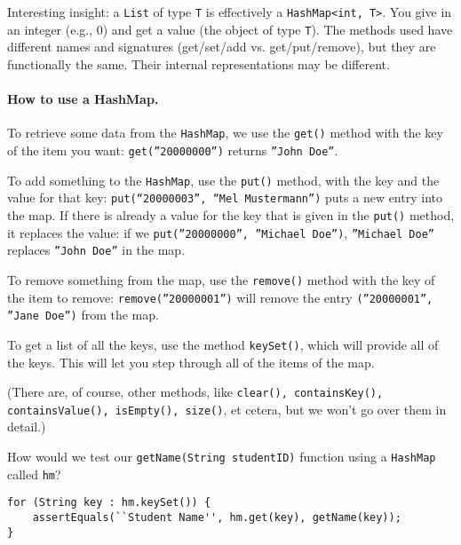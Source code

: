 Interesting insight: a \texttt{List} of type \texttt{T} is effectively a \texttt{HashMap<int, T>}. You give in an integer (e.g., 0) and get a value (the object of type \texttt{T}). The methods used have different names and signatures (get/set/add vs. get/put/remove), but they are functionally the same. Their internal representations may be different.

\paragraph{How to use a HashMap.}

To retrieve some data from the \texttt{HashMap}, we use the \texttt{get()} method with the key of the item you want: \texttt{get(''20000000'')} returns \texttt{''John Doe''}.

To add something to the \texttt{HashMap}, use the \texttt{put()} method, with the key and the value for that key: \texttt{put(``20000003'', ``Mel Mustermann'')} puts a new entry into the map. If there is already a value for the key that is given in the \texttt{put()} method, it replaces the value: if we \texttt{put(''20000000'', ''Michael Doe'')}, \texttt{''Michael Doe''} replaces \texttt{''John Doe''} in the map.

To remove something from the map, use the \texttt{remove()} method with the key of the item to remove: \texttt{remove(''20000001'')} will remove the entry \texttt{(''20000001'', ''Jane Doe'')} from the map.

To get a list of all the keys, use the method \texttt{keySet()}, which will provide all of the keys. This will let you step through all of the items of the map.

(There are, of course, other methods, like \texttt{clear(), containsKey(), containsValue(), isEmpty(), size()}, et cetera, but we won't go over them in detail.)

How would we test our \texttt{getName(String studentID)} function using a \texttt{HashMap} called \texttt{hm}?
\vspace{-2em}
\begin{verbatim}
for (String key : hm.keySet()) {
    assertEquals(``Student Name'', hm.get(key), getName(key));
}
\end{verbatim}
\vspace{-2em}



